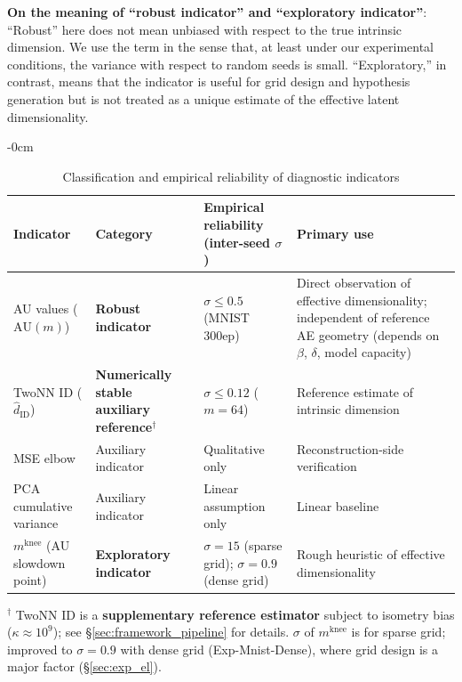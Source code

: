 \documentclass[make,article,submit,pdftex,moreauthors]{Definitions/mdpi}
\newcommand{\kap}{\kappa}
\newcommand{\mknee}{m^{\mathrm{knee}}}
\begin{document}
\textbf{On the meaning of ``robust indicator'' and ``exploratory indicator''}:
``Robust'' here does not mean unbiased with respect to the true intrinsic dimension.
We use the term in the sense that, at least under our experimental conditions,
the variance with respect to random seeds is small.
``Exploratory,'' in contrast, means that the indicator is useful for grid design
and hypothesis generation but is not treated as a unique estimate of the
effective latent dimensionality.

\begin{table}[H]
\begin{adjustwidth}{-\extralength}{0cm}
\centering
\caption{Classification and empirical reliability of diagnostic indicators}
\label{tab:indicator_class}
\small
\begin{tabular}{p{3.5cm}p{3.2cm}p{4.0cm}p{4.0cm}}
\toprule
Indicator & Category & Empirical reliability (inter-seed $\sigma$) & Primary use \\
\midrule
AU values ($\mathrm{AU}(m)$) & \textbf{Robust indicator} & $\sigma \leq 0.5$ (MNIST 300ep) & Direct observation of effective dimensionality; independent of reference AE geometry (depends on $\beta$, $\delta$, model capacity) \\
TwoNN ID ($\hat{d}_\mathrm{ID}$) & \textbf{Numerically stable auxiliary reference}$^\dagger$ & $\sigma \leq 0.12$ ($m=64$) & Reference estimate of intrinsic dimension \\
MSE elbow & Auxiliary indicator & Qualitative only & Reconstruction-side verification \\
PCA cumulative variance & Auxiliary indicator & Linear assumption only & Linear baseline \\
$\mknee$ (AU slowdown point) & \textbf{Exploratory indicator} & $\sigma=15$ (sparse grid); $\sigma=0.9$ (dense grid) & Rough heuristic of effective dimensionality \\
\bottomrule
\end{tabular}
\medskip
\footnotesize
$^\dagger$ TwoNN ID is a \textbf{supplementary reference estimator} subject to isometry bias ($\kap \approx 10^9$); see §\ref{sec:framework_pipeline} for details.
$\sigma$ of $\mknee$ is for sparse grid; improved to $\sigma=0.9$ with dense grid (Exp-Mnist-Dense), where grid design is a major factor (§\ref{sec:exp_el}).
\normalsize
\end{adjustwidth}
\end{table}
\end{document}
